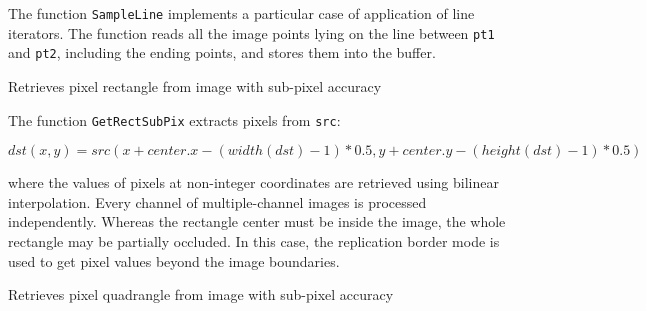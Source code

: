 \begin{description}
\end{description}

The function \texttt{SampleLine} implements a particular case of application of line iterators. The function reads all the image points lying on the line between \texttt{pt1} and \texttt{pt2}, including the ending points, and stores them into the buffer.

\label{GetRectSubPix}

Retrieves pixel rectangle from image with sub-pixel accuracy


\begin{description}
\end{description}

The function \texttt{GetRectSubPix} extracts pixels from \texttt{src}:

\[
dst(x, y) = src(x + center.x - (width(dst)-1)*0.5, y + center.y - (height(dst)-1)*0.5)
\]

where the values of pixels at non-integer coordinates are retrieved
using bilinear interpolation. Every channel of multiple-channel
images is processed independently. Whereas the rectangle center
must be inside the image, the whole rectangle may be partially
occluded. In this case, the replication border mode is used to get
pixel values beyond the image boundaries.

\label{GetQuadrangleSubPix}

Retrieves pixel quadrangle from image with sub-pixel accuracy


